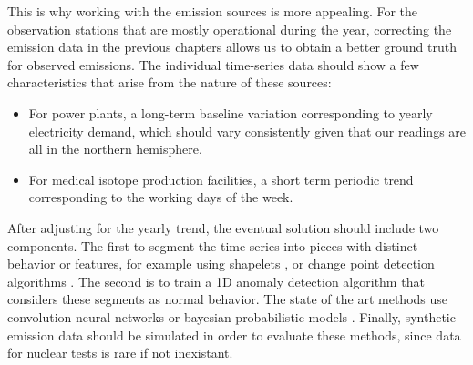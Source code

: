 \documentclass{article}
\begin{document}
This is why working with the emission sources is more appealing. For the observation stations that are mostly operational during the year, correcting the emission data in the previous chapters allows us to obtain a better ground truth for observed emissions. The individual time-series data should show a few characteristics that arise from the nature of these sources:
\begin{itemize}
    \item For power plants, a long-term baseline variation corresponding to yearly electricity demand, which should vary consistently given that our readings are all in the northern hemisphere.
    \item For medical isotope production facilities, a short term periodic trend corresponding to the working days of the week.  
\end{itemize}  
After adjusting for the yearly trend, the eventual solution should include two components. The first to segment the time-series into pieces with distinct behavior or features, for example using shapelets \cite{10.1145/2623330.2623613},\cite{10.1007/978-3-030-39098-3_7} or change point detection algorithms \cite{TRUONG2020107299}. The second is to train a 1D anomaly detection algorithm that considers these segments as normal behavior. The state of the art methods use convolution neural networks \cite{KIRANYAZ2021107398} or bayesian probabilistic models \cite{https://doi.org/10.48550/arxiv.1902.08627}. Finally, synthetic emission data should be simulated in order to evaluate these methods, since data for nuclear tests is rare if not inexistant.

    
\printbibliography
\end{document}
